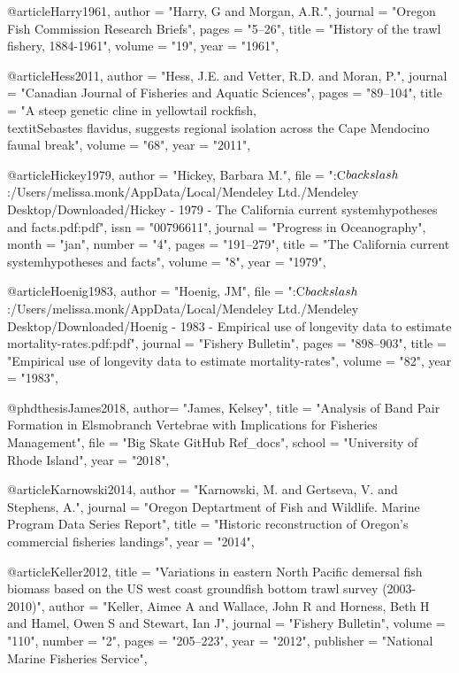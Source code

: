 @article{Harry1961,
    author = "{Harry, G and Morgan, A.R.}",
    journal = "{Oregon Fish Commission Research Briefs}",
    pages = "{5--26}",
    title = "{{History of the trawl fishery, 1884-1961}}",
    volume = "{19}",
    year = "{1961}",
}

@article{Hess2011,
    author = "{Hess, J.E. and Vetter, R.D. and Moran, P.}",
    journal = "{Canadian Journal of Fisheries and Aquatic Sciences}",
    pages = "{89--104}",
    title = "{{A steep genetic cline in yellowtail rockfish, \\textit{{Sebastes} flavidus}, suggests regional isolation across the Cape Mendocino faunal break}}",
    volume = "{68}",
    year = "{2011}",
}

@article{Hickey1979,
    author = "{Hickey, Barbara M.}",
    file = "{:C$\\backslash$:/Users/melissa.monk/AppData/Local/Mendeley Ltd./Mendeley Desktop/Downloaded/Hickey - 1979 - The California current systemhypotheses and facts.pdf:pdf}",
    issn = "{00796611}",
    journal = "{Progress in Oceanography}",
    month = "jan",
    number = "{4}",
    pages = "{191--279}",
    title = "{{The California current systemhypotheses and facts}}",
    volume = "{8}",
    year = "{1979}",
}

@article{Hoenig1983,
    author = "{Hoenig, JM}",
    file = "{:C$\\backslash$:/Users/melissa.monk/AppData/Local/Mendeley Ltd./Mendeley Desktop/Downloaded/Hoenig - 1983 - Empirical use of longevity data to estimate mortality-rates.pdf:pdf}",
    journal = "{Fishery Bulletin}",
    pages = "{898--903}",
    title = "{{Empirical use of longevity data to estimate mortality-rates}}",
    volume = "{82}",
    year = "{1983}",
}

@phdthesis{James2018,
    author= "{James, Kelsey}",
    title = "{Analysis of Band Pair Formation in Elsmobranch Vertebrae with Implications for Fisheries Management}",
    file = "{Big Skate GitHub Ref_docs}",
    school = "{University of Rhode Island}",
    year = "{2018}",
}

@article{Karnowski2014,
    author = "{Karnowski, M. and Gertseva, V. and Stephens, A.}",
    journal = "{Oregon Deptartment of Fish and Wildlife. Marine Program Data Series Report}",
    title = "{{Historic reconstruction of Oregon's commercial fisheries landings}}",
    year = "{2014}",
}

@article{Keller2012,
    title = "{Variations in eastern North Pacific demersal fish biomass based on the US west coast groundfish bottom trawl survey (2003-2010)}",
    author = "{Keller, Aimee A and Wallace, John R and Horness, Beth H and Hamel, Owen S and Stewart, Ian J}",
    journal = "{Fishery Bulletin}",
    volume = "{110}",
    number = "{2}",
    pages = "{205--223}",
    year = "{2012}",
    publisher = "{National Marine Fisheries Service}",
}

